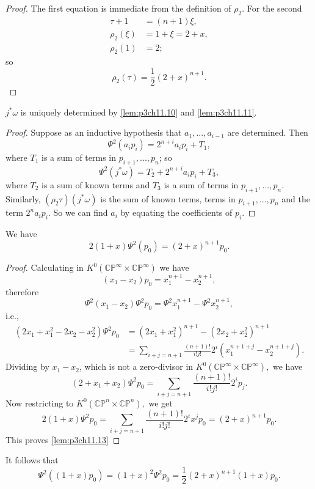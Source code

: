 \documentclass[../main]{subfiles}
\begin{document}
\begin{proof}
The first equation is immediate from the definition of $\rho_2$. For the second 
\begin{align}
\tau + 1 &= (n+1)\xi, \nonumber \\
\rho_2(\xi) &= 1+\xi = 2+x, \nonumber \\
\rho_2(1)&=2 \nonumber;
\end{align}
so \[\rho_2(\tau)=\frac{1}{2}(2+x)^{n+1}.\]
\end{proof}
\begin{lemma} \label{lem:p3ch11.12}
$j^\ast \omega$ is uniquely determined by \ref{lem:p3ch11.10} and \ref{lem:p3ch11.11}.
\end{lemma}
\begin{proof}
Suppose as an inductive hypothesis that $a_1,...,a_{i-1}$ are determined. Then 
\[\Psi^2(a_ip_i)=2^{n+i}a_ip_i+T_1,\] 
where $T_1$ is a sum of terms in $p_{i+1},...,p_n$; so 
\[\Psi^2(j^\ast \omega)=T_2+2^{n+i}a_ip_i+T_3,\]
where $T_2$ is a sum of known terms and $T_3$ is a sum of terms in $p_{i+1},...,p_n.$ Similarly, $(\rho_2\tau)(j^\ast \omega)$ is the sum of known terms, terms in $p_{i+1},...,p_n$ and the term $2^na_ip_i$. So we can find $a_i$ by equating the coefficients of $p_i$.
\end{proof}
\begin{lemma}\label{lem:p3ch11.13}
We have 
\[2(1+x)\Psi^2(p_0)=(2+x)^{n+1}p_0.\]
\end{lemma}
\begin{proof}
Calculating in $K^0(\mathbb{CP}^\infty\times\mathbb{CP}^\infty)$ we have 
\[(x_1-x_2)p_0=x_1^{n+1}-x_2^{n+1},\]
therefore 
\[\Psi^2(x_1-x_2)\Psi^2p_0=\Psi^2x_1^{n+1}-\Psi^2x_2^{n+1},\]
i.e.,
\begin{align}
    (2x_1+x_1^2-2x_2-x_2^2)\Psi^2p_0 &= (2x_1+x_1^2)^{n+1}-(2x_2+x_2^2)^{n+1} \nonumber \\
    &=\sum_{i+j=n+1}\frac{(n+1)!}{i!j!}2^i(x_1^{n+1+j}-x_2^{n+1+j}). \nonumber
\end{align}
Dividing by $x_1-x_2$, which is not a zero-divisor in $K^0(\mathbb{CP}^\infty\times\mathbb{CP}^\infty),$ we have 
\[(2+x_1+x_2)\Psi^2p_0=\sum_{i+j=n+1}\frac{(n+1)!}{i!j!}2^ip_j.\]
Now restricting to $K^0(\mathbb{CP}^n\times\mathbb{CP}^n),$ we get
\[2(1+x)\Psi^2p_0=\sum_{i+j=n+1}\frac{(n+1)!}{i!j!}2^ix^jp_0=(2+x)^{n+1}p_0.\]
This proves \ref{lem:p3ch11.13}
\end{proof}
\par It follows that 
\[\Psi^2((1+x)p_0)=(1+x)^2\Psi^2p_0=\frac{1}{2}(2+x)^{n+1}(1+x)p_0.\]
\end{document}
